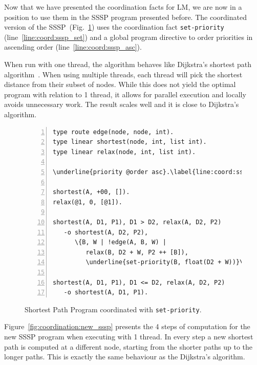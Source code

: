 Now that we have presented the coordination facts for LM, we are now in a
position to use them in the SSSP program presented before.  The coordinated
version of the SSSP~(Fig.~\ref{code:shortest_path_program_coord}) uses the
coordination fact \texttt{set-priority} (line~\ref{line:coord:sssp_set}) and a global program directive
to order priorities in ascending order (line~\ref{line:coord:sssp_asc}).

When run with one thread, the algorithm behaves like Dijkstra's shortest path
algorithm~\cite{Dijkstra}. When using multiple threads, each thread will pick
the shortest distance from their subset of nodes.  While this does not yield the
optimal program with relation to 1 thread, it allows for parallel execution and
locally avoids unnecessary work. The result scales well and it is close to
Dijkstra's algorithm.

\begin{figure}[ht]
\begin{Verbatim}[numbers=left,commandchars=\\\{\},fontsize=\scriptsize]
type route edge(node, node, int).
type linear shortest(node, int, list int).
type linear relax(node, int, list int).

\underline{priority @order asc}.\label{line:coord:sssp_asc}

shortest(A, +00, []).
relax(@1, 0, [@1]).

shortest(A, D1, P1), D1 > D2, relax(A, D2, P2)
   -o shortest(A, D2, P2),
      \{B, W | !edge(A, B, W) |
         relax(B, D2 + W, P2 ++ [B]),
         \underline{set-priority(B, float(D2 + W))}\}.\label{line:coord:sssp_set}

shortest(A, D1, P1), D1 <= D2, relax(A, D2, P2)
   -o shortest(A, D1, P1).
\end{Verbatim}
   \caption{Shortest Path Program coordinated with \texttt{set-priority}.}
   \label{code:shortest_path_program_coord}
\end{figure}

Figure~\ref{fig:coordination:new_sssp} presents the 4 steps of computation for
the new SSSP program when executing with 1 thread. In every step a new shortest
path is computed at a different node, starting from the shorter paths up to
the longer paths. This is exactly the same behaviour as the Dijkstra's
algorithm.

